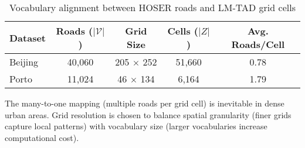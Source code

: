 \begin{table}[H]
    \centering
    \caption{Vocabulary alignment between HOSER roads and LM-TAD grid cells}
    \label{tab:vocab-alignment-appendix}
    \begin{tabular}{lcccc}
        \toprule
        \textbf{Dataset} & \textbf{Roads ($|\mathcal{V}|$)} & \textbf{Grid Size} & \textbf{Cells ($|Z|$)} & \textbf{Avg. Roads/Cell} \\
        \midrule
        Beijing          & 40,060                           & 205 $\times$ 252   & 51,660                 & 0.78                     \\
        Porto            & 11,024                           & 46 $\times$ 134    & 6,164                  & 1.79                     \\
        \bottomrule
    \end{tabular}
\end{table}

The many-to-one mapping (multiple roads per grid cell) is inevitable in dense urban areas. Grid resolution is chosen to balance spatial granularity (finer grids capture local patterns) with vocabulary size (larger vocabularies increase computational cost).

